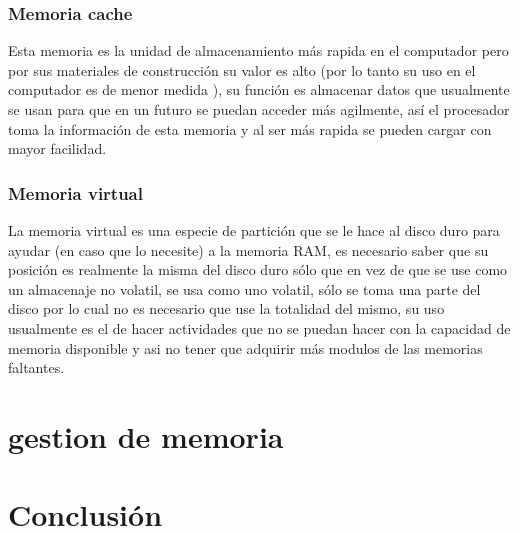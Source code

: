\documentclass{article}
\begin{document}
\subsubsection{Memoria cache}
Esta memoria es la unidad de almacenamiento más rapida en el computador pero por sus materiales de construcción su valor es alto (por lo tanto su uso en el computador es de menor medida ), su función es almacenar datos que usualmente se usan para que en un futuro se puedan acceder más agilmente, así el procesador toma la información de esta memoria y al ser más rapida se pueden cargar con mayor facilidad.
\vfill
\vspace{0,1cm}
\subsubsection{Memoria virtual}
La memoria virtual es una especie de partición que se le hace al disco duro para ayudar (en caso que lo necesite) a la memoria RAM, es necesario saber que su posición es realmente la misma del disco duro sólo que en vez de que se use como un almacenaje no volatil, se usa como uno volatil, sólo se toma una parte del disco por lo cual no es necesario que use la totalidad del mismo, su uso usualmente es el de hacer actividades que no se puedan hacer con la capacidad de memoria disponible y asi no tener que adquirir más modulos de las memorias faltantes.
\section{gestion de memoria}
\section{Conclusión} \label{conclulsion}



\end{document}
